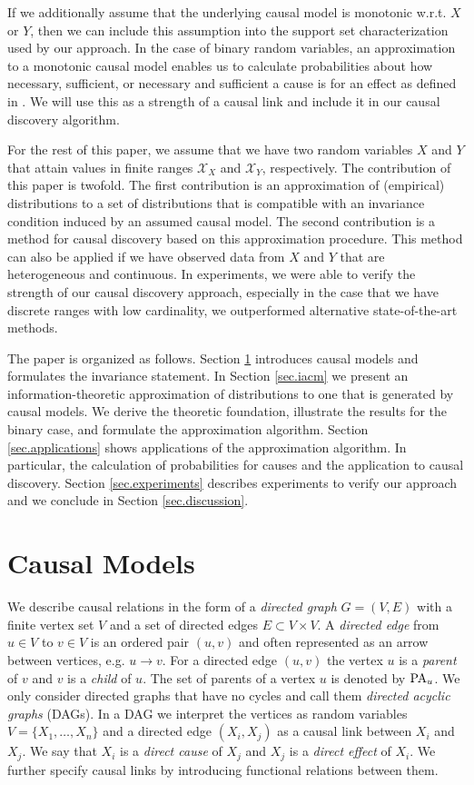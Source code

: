\documentclass[letterpaper]{article}
\newcommand{\kX}{\mathcal{X}}   %
\begin{document}
If we additionally assume that the underlying causal model is monotonic w.r.t. $X$ or $Y$, then we can include this assumption into the support set characterization used by our approach. In the case of binary random variables, an approximation to a monotonic causal model enables us to calculate probabilities about how necessary, sufficient, or necessary and sufficient a cause is for an effect as defined in \cite{Pea09}. We will use this as a strength of a causal link and include it in our causal discovery algorithm.

For the rest of this paper, we assume that we have two random variables $X$ and $Y$ that attain values in finite ranges $\kX_X$ and $\kX_Y$, respectively. The contribution of this paper is twofold. The first contribution is an approximation of (empirical) distributions to a set of distributions that is compatible with an invariance condition induced by an assumed causal model. The second contribution is a method for causal discovery based on this approximation procedure. This method can also be applied if we have observed data from $X$ and $Y$ that are heterogeneous and continuous. In experiments, we were able to verify the strength of our causal discovery approach, especially in the case that we have discrete ranges with low cardinality, we outperformed alternative state-of-the-art methods.

The paper is organized as follows. Section \ref{sec.causalModels} introduces causal models and formulates the invariance statement. In Section \ref{sec.iacm} we present an information-theoretic approximation of distributions to one that is generated by causal models. We derive the theoretic foundation, illustrate the results for the binary case, and formulate the approximation algorithm. Section \ref{sec.applications} shows applications of the approximation algorithm. In particular, the calculation of probabilities for causes and the application to causal discovery. Section \ref{sec.experiments} describes experiments to verify our approach and we conclude in Section \ref{sec.discussion}.

\section{Causal Models} \label{sec.causalModels}

We describe causal relations in the form of a {\em directed graph} $G=(V,E)$ with a finite vertex set $V$ and a set of directed edges $E \subset V \times V$. A {\em directed edge} from $u \in V$ to $v \in V$ is an ordered pair $(u,v)$ and often represented as an arrow between vertices, e.g. $u \rightarrow v$. For a directed edge $(u,v)$ the vertex $u$ is a {\em parent} of $v$ and $v$ is a {\em child} of $u$. The set of parents of a vertex $u$ is denoted by ${\rm PA}_u$. We only consider directed graphs that have no cycles and call them {\em directed acyclic graphs} (DAGs). In a DAG we interpret the vertices as random variables $V=\{X_1, \ldots, X_n\}$ and a directed edge $(X_i, X_j)$ as a causal link between $X_i$ and $X_j$. We say that $X_i$ is a {\em direct cause} of $X_j$ and $X_j$ is a {\em direct effect} of $X_i$. We further specify causal links by introducing functional relations between them.
\end{document}
